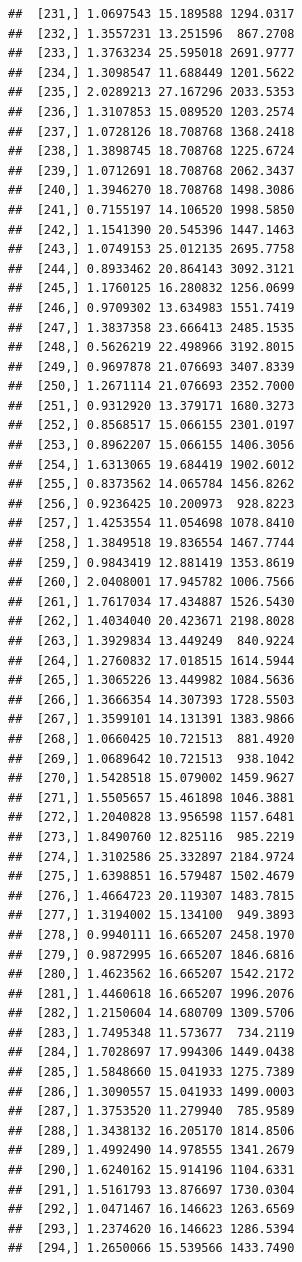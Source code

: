 \documentclass[article]{jss}\usepackage[]{graphicx}\usepackage[]{xcolor}
\makeatletter
\newenvironment{kframe}{%
 \def\at@end@of@kframe{}%
 \ifinner\ifhmode%
  \def\at@end@of@kframe{\end{minipage}}%
  \begin{minipage}{\columnwidth}%
 \fi\fi%
 \def\FrameCommand##1{\hskip\@totalleftmargin \hskip-\fboxsep
 \colorbox{shadecolor}{##1}\hskip-\fboxsep
     \hskip-\linewidth \hskip-\@totalleftmargin \hskip\columnwidth}%
 \MakeFramed {\advance\hsize-\width
   \@totalleftmargin\z@ \linewidth\hsize
   \@setminipage}}%
 {\par\unskip\endMakeFramed%
 \at@end@of@kframe}
\newenvironment{knitrout}{}{} %
\makeatother
\begin{document}
\begin{knitrout}
\begin{kframe}
\begin{verbatim}
##  [231,] 1.0697543 15.189588 1294.0317
##  [232,] 1.3557231 13.251596  867.2708
##  [233,] 1.3763234 25.595018 2691.9777
##  [234,] 1.3098547 11.688449 1201.5622
##  [235,] 2.0289213 27.167296 2033.5353
##  [236,] 1.3107853 15.089520 1203.2574
##  [237,] 1.0728126 18.708768 1368.2418
##  [238,] 1.3898745 18.708768 1225.6724
##  [239,] 1.0712691 18.708768 2062.3437
##  [240,] 1.3946270 18.708768 1498.3086
##  [241,] 0.7155197 14.106520 1998.5850
##  [242,] 1.1541390 20.545396 1447.1463
##  [243,] 1.0749153 25.012135 2695.7758
##  [244,] 0.8933462 20.864143 3092.3121
##  [245,] 1.1760125 16.280832 1256.0699
##  [246,] 0.9709302 13.634983 1551.7419
##  [247,] 1.3837358 23.666413 2485.1535
##  [248,] 0.5626219 22.498966 3192.8015
##  [249,] 0.9697878 21.076693 3407.8339
##  [250,] 1.2671114 21.076693 2352.7000
##  [251,] 0.9312920 13.379171 1680.3273
##  [252,] 0.8568517 15.066155 2301.0197
##  [253,] 0.8962207 15.066155 1406.3056
##  [254,] 1.6313065 19.684419 1902.6012
##  [255,] 0.8373562 14.065784 1456.8262
##  [256,] 0.9236425 10.200973  928.8223
##  [257,] 1.4253554 11.054698 1078.8410
##  [258,] 1.3849518 19.836554 1467.7744
##  [259,] 0.9843419 12.881419 1353.8619
##  [260,] 2.0408001 17.945782 1006.7566
##  [261,] 1.7617034 17.434887 1526.5430
##  [262,] 1.4034040 20.423671 2198.8028
##  [263,] 1.3929834 13.449249  840.9224
##  [264,] 1.2760832 17.018515 1614.5944
##  [265,] 1.3065226 13.449982 1084.5636
##  [266,] 1.3666354 14.307393 1728.5503
##  [267,] 1.3599101 14.131391 1383.9866
##  [268,] 1.0660425 10.721513  881.4920
##  [269,] 1.0689642 10.721513  938.1042
##  [270,] 1.5428518 15.079002 1459.9627
##  [271,] 1.5505657 15.461898 1046.3881
##  [272,] 1.2040828 13.956598 1157.6481
##  [273,] 1.8490760 12.825116  985.2219
##  [274,] 1.3102586 25.332897 2184.9724
##  [275,] 1.6398851 16.579487 1502.4679
##  [276,] 1.4664723 20.119307 1483.7815
##  [277,] 1.3194002 15.134100  949.3893
##  [278,] 0.9940111 16.665207 2458.1970
##  [279,] 0.9872995 16.665207 1846.6816
##  [280,] 1.4623562 16.665207 1542.2172
##  [281,] 1.4460618 16.665207 1996.2076
##  [282,] 1.2150604 14.680709 1309.5706
##  [283,] 1.7495348 11.573677  734.2119
##  [284,] 1.7028697 17.994306 1449.0438
##  [285,] 1.5848660 15.041933 1275.7389
##  [286,] 1.3090557 15.041933 1499.0003
##  [287,] 1.3753520 11.279940  785.9589
##  [288,] 1.3438132 16.205170 1814.8506
##  [289,] 1.4992490 14.978555 1341.2679
##  [290,] 1.6240162 15.914196 1104.6331
##  [291,] 1.5161793 13.876697 1730.0304
##  [292,] 1.0471467 16.146623 1263.6569
##  [293,] 1.2374620 16.146623 1286.5394
##  [294,] 1.2650066 15.539566 1433.7490

\end{verbatim}
\end{kframe}
\end{knitrout}
\end{document}
